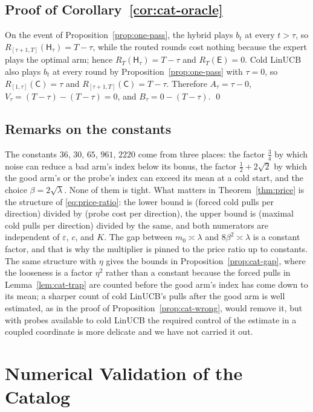 \documentclass{article}
\theoremstyle{definition}
\theoremstyle{remark}
\newcommand{\eps}{\varepsilon}
\theoremstyle{remark}
\newcommand{\Cold}{\mathsf{C}}
\newcommand{\Exp}{\mathsf{E}}
\newcommand{\Hyb}{\mathsf{H}}
\begin{document}
\subsection{Proof of Corollary~\ref{cor:cat-oracle}}

On the event of Proposition~\ref{prop:one-pass}, the hybrid plays $b_t$ at
every $t>\tau$, so $R_{[\tau+1,T]}(\Hyb_\tau)=T-\tau$, while the routed rounds
cost nothing because the expert plays the optimal arm; hence
$R_T(\Hyb_\tau)=T-\tau$ and $R_T(\Exp)=0$. Cold LinUCB also plays $b_t$ at
every round by Proposition~\ref{prop:one-pass} with $\tau=0$, so
$R_{[1,\tau]}(\Cold)=\tau$ and $R_{[\tau+1,T]}(\Cold)=T-\tau$. Therefore
$A_\tau=\tau-0$, $V_\tau=(T-\tau)-(T-\tau)=0$, and $B_\tau=0-(T-\tau)$. \qed

\subsection{Remarks on the constants}

The constants $36$, $30$, $65$, $961$, $2220$ come from three places: the
factor $\tfrac34$ by which noise can reduce a bad arm's index below its bonus,
the factor $\tfrac12+2\sqrt2$ by which the good arm's or the probe's index can
exceed its mean at a cold start, and the choice $\beta=2\sqrt\lambda$. None of
them is tight. What matters in Theorem~\ref{thm:price} is the structure of
\eqref{eq:price-ratio}: the lower bound is (forced cold pulls per direction)
divided by (probe cost per direction), the upper bound is (maximal cold pulls
per direction) divided by the same, and both numerators are independent of
$\eps$, $c$, and $K$. The gap between $m_0\asymp\lambda$ and $8\beta^2\asymp\lambda$
is a constant factor, and that is why the multiplier is pinned to the price
ratio up to constants. The same structure with $\eta$ gives the bounds in
Proposition~\ref{prop:cat-gap}, where the looseness is a factor $\eta^2$ rather
than a constant because the forced pulls in Lemma~\ref{lem:cat-trap} are
counted before the good arm's index has come down to its mean; a sharper
count of cold LinUCB's pulls after the good arm is well estimated, as in the
proof of Proposition~\ref{prop:cat-wrong}, would remove it, but with probes
available to cold LinUCB the required control of the estimate in a coupled
coordinate is more delicate and we have not carried it out.


\section{Numerical Validation of the Catalog}
\label{app:synthetic}
\end{document}
